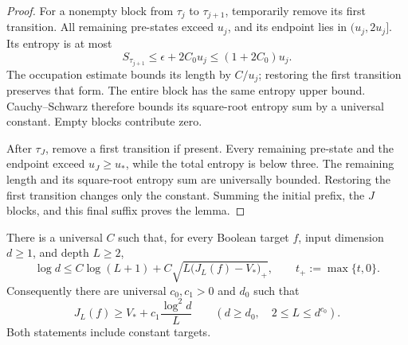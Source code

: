 \begin{proof}
For a nonempty block from $\tau_j$ to $\tau_{j+1}$, temporarily
remove its first transition. All remaining pre-states exceed $u_j$,
and its endpoint lies in $(u_j,2u_j]$. Its entropy is at most
\[
 S_{\tau_{j+1}}\le\epsilon+2C_0u_j\le(1+2C_0)u_j.
\]
The occupation estimate bounds its length by $C/u_j$; restoring the
first transition preserves that form. The entire block has the same
entropy upper bound. Cauchy--Schwarz therefore bounds its square-root
entropy sum by a universal constant. Empty blocks contribute zero.

After $\tau_J$, remove a first transition if present. Every remaining
pre-state and the endpoint exceed $u_J\ge u_*$, while the total
entropy is below three. The remaining length and its square-root
entropy sum are universally bounded. Restoring the first transition
changes only the constant. Summing the initial prefix, the $J$
blocks, and this final suffix proves the lemma.
\end{proof}

\begin{theorem}
\label{thm:critical-excess-dimension-lower}
There is a universal $C$ such that, for every Boolean target $f$,
input dimension $d\ge1$, and depth $L\ge2$,
\[
 \log d\le C\log(L+1)+
             C\sqrt{L\bigl(J_L(f)-V_*\bigr)_+},
 \qquad t_+:=\max\{t,0\}.
\]
Consequently there are universal $c_0,c_1>0$ and $d_0$ such that
\[
 J_L(f)\ge V_*+c_1\frac{\log^2d}{L}
 \qquad(d\ge d_0,\quad 2\le L\le d^{c_0}).
\]
Both statements include constant targets.
\end{theorem}


